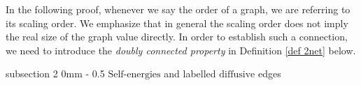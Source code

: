 \documentclass{article}
\makeatletter
\newcommand{\1}{\mathds{1}}
\numberwithin{equation}{section}
\renewcommand{\cal}{\mathcal}
\newcommand{\dashed}{\text{diffusive}}
\newcommand{\Selfs}{\text{Self-energies}}
\DeclareMathOperator{\OO}{O}
\theoremstyle{plain} %
\theoremstyle{remark}
\renewcommand{\subsection}{\@startsection
	{subsection}%
	{2}%
	{0mm}%
	{-\baselineskip}%
	{0.5\baselineskip}%
	{\normalfont\bf\itshape}} %
\makeatother
\begin{document}

In the following proof, whenever we say the order of a graph, we are referring to its scaling order. We emphasize that in general the scaling order does not imply the real size of the graph value directly. In order to establish such a connection, we need to introduce the \emph{doubly connected property} in Definition \ref{def 2net} below.  







\subsection{$\Selfs$ and labelled $\dashed$ edges}\label{sec_selfc}
\end{document}

